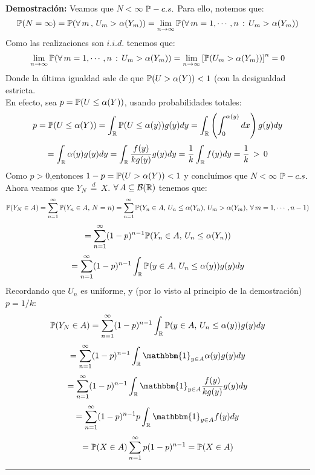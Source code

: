 \textbf{Demostración: }Veamos que $N<\infty$ $\mathbb{P}-c.s.$ Para ello, notemos que:
\[\mathbb{P}(N=\infty) = \mathbb{P}(\forall\,m\,,\,U_m>\alpha(Y_m)) = \lim_{n \rightarrow \infty}\mathbb{P}(\forall\,m=1,\cdots,n\,:\,U_m>\alpha(Y_m))\]
Como las realizaciones son $i.i.d.$ tenemos que:
\[\lim_{n \rightarrow \infty}\mathbb{P}(\forall\,m=1,\cdots,n\,:\,U_m>\alpha(Y_m)) = \lim_{n \rightarrow \infty}\left[\mathbb{P}(U_m > \alpha(Y_m))\right]^{n} = 0\]
Donde la última igualdad sale de que $\mathbb{P}(U>\alpha(Y)) < 1$ (con la desigualdad estricta.\\ \newline
En efecto, sea $p=\mathbb{P}(U\leq \alpha(Y))$, usando probabilidades totales:
\[p = \mathbb{P}(U\leq \alpha(Y)) = \int_{\mathbb R}\mathbb{P}(U\leq \alpha(y))g(y)dy= \int_{\mathbb R}\left(\int_{0}^{\alpha(y)}dx\right)g(y)dy\]
\[=\int_{\mathbb R}\alpha(y)g(y)dy = \int_{\mathbb R}\frac{f(y)}{kg(y)}g(y)dy = \frac{1}{k}\int_{\mathbb R}f(y)dy = \frac{1}{k}\,>\,0\]
Como $p>0$,entonces $1-p = \mathbb{P}(U>\alpha(Y))<1$ y concluímos que $N<\infty$ $\mathbb{P}-c.s.$\\ \newline
Ahora veamos que $Y_N \,\overset{d}{=}\,X$. $\forall\,A\subseteq \mathcal{B}(\mathbb R)$ tenemos que:
\[\mathbb{P}(Y_N \in A) = \sum_{n=1}^{\infty}\mathbb{P}(Y_n \in A,\,N=n) = \sum_{n=1}^{\infty}\mathbb{P}(Y_n \in A,\,U_n\leq\alpha(Y_n),\,U_m>\alpha(Y_m),\,\forall\,m=1,\cdots,n-1)\]
\[=\sum_{n=1}^{\infty}(1-p)^{n-1}\mathbb{P}(Y_n \in A,\,U_n\leq \alpha(Y_n))\]\[= \sum_{n=1}^{\infty}(1-p)^{n-1} \int_{\mathbb R}\mathbb{P}(y \in A,\,U_n\leq \alpha(y))g(y)dy\]
Recordando que $U_n$ es uniforme, y (por lo visto al principio de la demostración) $p=1/k$:
\[\mathbb{P}(Y_N \in A)= \sum_{n=1}^{\infty}(1-p)^{n-1} \int_{\mathbb R}\mathbb{P}(y \in A,\,U_n\leq \alpha(y))g(y)dy\]\[= \sum_{n=1}^{\infty}(1-p)^{n-1}\int_{\R}\mathbbm{1}_{y\in A}\alpha(y)g(y) dy\]
\[=\sum_{n=1}^{\infty}(1-p)^{n-1}\int_{\R}\mathbbm{1}_{y\in A}\frac{f(y)}{kg(y)}g(y) dy\] \[= \sum_{n=1}^{\infty}(1-p)^{n-1}p\int_{\R}\mathbbm{1}_{y\in A}f(y) dy\] \[= \mathbb{P}(X \in A)\sum_{n=1}^{\infty}p(1-p)^{n-1}= \mathbb{P}(X\in A)\] 
\rule{0.7em}{0.7em}\\

